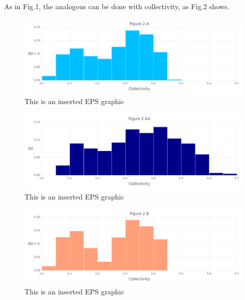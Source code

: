 \documentclass[10pt,letterpaper]{article}
\begin{document}
\clearpage
As in Fig.1, the analogous can be done with collectivity, as Fig.2 shows.

\begin{figure}[ht]
\begin{center}
\includegraphics[scale=0.5]{1hvr_hol/2afigure_very_hi-precision.pdf}
\caption{This is an inserted EPS graphic}
\label{fig3}
\end{center}
\end{figure}

\begin{figure}[ht]
\begin{center}
\includegraphics[scale=0.5]{1hvr_hol/2aafigure_very_hi-precision.pdf}
\caption{This is an inserted EPS graphic}
\label{fig4}
\end{center}
\end{figure}

\begin{figure}[ht]
\begin{center}
\includegraphics[scale=0.5]{1hvr_hol/2bfigure_very_hi-precision.pdf}
\caption{This is an inserted EPS graphic}
\label{fig5}
\end{center}
\end{figure}
\end{document}
